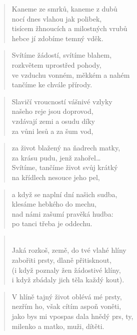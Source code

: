\documentclass{book}
\begin{document}
\newpage
{}
\begin{verse}
Kaneme ze smrků, kaneme z dubů\\
nocí dnes vlahou jak polibek,\\
tisícem žhnoucích a milostných vrubů\\
hebce jí zdobíme temný vděk.
\end{verse}
\begin{verse}
Svítíme žádostí, svítíme blahem,\\
rozkvětem uprostřed pohody,\\
ve vzduchu vonném, měkkém a nahém\\
tančíme ke chvále přírody.
\end{verse}
\begin{verse}
Slavičí vroucností vášnivé vzlyky\\
našeho reje jsou doprovod,\\
vzdávají zemi a osudu díky\\
za vůni lesů a za šum vod,
\end{verse}
\begin{verse}
za život blažený na ňadrech matky,\\
za krásu pudu, jenž zahořel\ldots\\
Svítíme, tančíme život svůj krátký\\
na křídlech nesouce jeho pel,
\end{verse}
\begin{verse}
a když se naplní dní našich sudba,\\
klesáme hebkého do mechu,\\
nad námi zašumí pravěká hudba:\\
po tanci třeba je oddechu.
\end{verse}
\newpage
{}
\begin{verse}
\large{}\\
\normalsize
Jaká rozkoš, země, do tvé vlahé hlíny\\
zabořiti prsty, dlaně přitisknout,\\
(i když poznaly žen žádostivé klíny,\\
i když zbádaly jich těla každý kout).
\end{verse}
\begin{verse}
V hlíně tajný život oblévá mé prsty,\\
nezřím ho, však cítím aspoň voněti,\\
jako bys mi vpospas dala hnědý prs, ty,\\
milenko a matko, muži, dítěti.
\end{verse}
\end{document}
